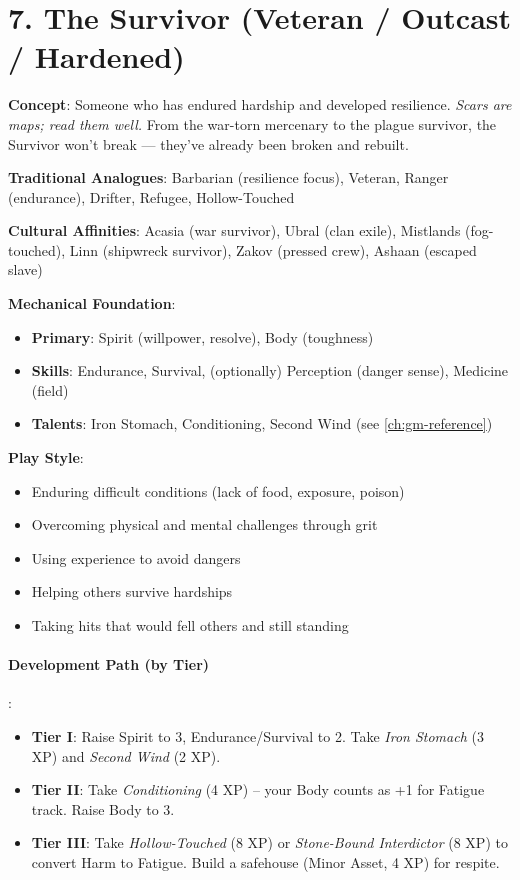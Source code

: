 \section{7. The Survivor (Veteran / Outcast / Hardened)}
\label{sec:concept-survivor}

\textbf{Concept}: Someone who has endured hardship and developed resilience. \emph{Scars are maps; read them well.} From the war-torn mercenary to the plague survivor, the Survivor won't break --- they've already been broken and rebuilt.

\textbf{Traditional Analogues}: Barbarian (resilience focus), Veteran, Ranger (endurance), Drifter, Refugee, Hollow-Touched

\textbf{Cultural Affinities}: Acasia (war survivor), Ubral (clan exile), Mistlands (fog-touched), Linn (shipwreck survivor), Zakov (pressed crew), Ashaan (escaped slave)

\textbf{Mechanical Foundation}:
\begin{itemize}
\item \textbf{Primary}: Spirit (willpower, resolve), Body (toughness)
\item \textbf{Skills}: Endurance, Survival, (optionally) Perception (danger sense), Medicine (field)
\item \textbf{Talents}: Iron Stomach, Conditioning, Second Wind (see \ref{ch:gm-reference})
\end{itemize}

\textbf{Play Style}:
\begin{itemize}
\item Enduring difficult conditions (lack of food, exposure, poison)
\item Overcoming physical and mental challenges through grit
\item Using experience to avoid dangers
\item Helping others survive hardships
\item Taking hits that would fell others and still standing
\end{itemize}

\paragraph{Development Path (by Tier)}:
\begin{itemize}
\item \textbf{Tier I}: Raise Spirit to 3, Endurance/Survival to 2. Take \emph{Iron Stomach} (3 XP) and \emph{Second Wind} (2 XP).
\item \textbf{Tier II}: Take \emph{Conditioning} (4 XP) -- your Body counts as +1 for Fatigue track. Raise Body to 3.
\item \textbf{Tier III}: Take \emph{Hollow-Touched} (8 XP) or \emph{Stone-Bound Interdictor} (8 XP) to convert Harm to Fatigue. Build a safehouse (Minor Asset, 4 XP) for respite.
\end{itemize}


